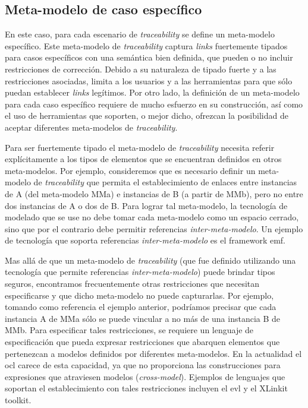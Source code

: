 \documentclass[a4paper,12pt,oneside,spanish]{book}
\begin{document}
\subsection{Meta-modelo de caso específico}

En este caso, para cada escenario de \textit{traceability} se define un meta-modelo específico. Este meta-modelo de \textit{traceability} captura \textit{links} fuertemente tipados para casos específicos con una semántica bien definida, que pueden o no incluir restricciones de corrección. Debido a su naturaleza de tipado fuerte y a las restricciones asociadas, limita a los usuarios y a las herramientas para que sólo puedan establecer \textit{links} legítimos. Por otro lado, la definición de un meta-modelo para cada caso específico requiere de mucho esfuerzo en su construcción, así como el uso de herramientas que soporten, o mejor dicho, ofrezcan la posibilidad de aceptar diferentes meta-modelos de \textit{traceability}.

Para ser fuertemente tipado el meta-modelo de \textit{traceability} necesita referir explícitamente a los tipos de elementos que se encuentran definidos en otros meta-modelos. Por ejemplo, consideremos que es necesario definir un meta-modelo de \textit{traceability} que permita el establecimiento de enlaces entre instancias de \textsf{A} (del meta-modelo \textsf{MMa}) e instancias de \textsf{B} (a partir de \textsf{MMb}), pero no entre dos instancias de \textsf{A} o dos de \textsf{B}. Para lograr tal meta-modelo, la tecnología de modelado que se use no debe tomar cada meta-modelo como un espacio cerrado, sino que por el contrario debe permitir referencias \textit{inter-meta-modelo}. Un ejemplo de tecnología que soporta referencias \textit{inter-meta-modelo} es el framework \gls{emf}.

Mas allá de que un meta-modelo de \textit{traceability} (que fue definido utilizando una tecnología que permite referencias \textit{inter-meta-modelo}) puede brindar tipos seguros, encontramos frecuentemente otras restricciones que necesitan especificarse y que dicho meta-modelo no puede capturarlas. Por ejemplo, tomando como referencia el ejemplo anterior, podríamos precisar que cada instancia \textsf{A} de \textsf{MMa} sólo se puede vincular a no más de una instancia \textsf{B} de \textsf{MMb}. Para especificar tales restricciones, se requiere un lenguaje de especificación que pueda expresar restricciones que abarquen elementos que pertenezcan a modelos definidos por diferentes meta-modelos. En la actualidad el \gls{ocl} carece de esta capacidad, ya que no proporciona las construcciones para expresiones que atraviesen modelos (\textit{cross-model}). Ejemplos de lenguajes que soportan el establecimiento con tales restricciones incluyen el \gls{evl} y el XLinkit toolkit.
\end{document}
